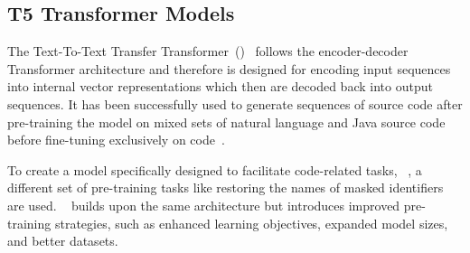 \subsection{T5 Transformer Models}

The Text-To-Text Transfer Transformer~(\tfive)~\cite{Raffel2019}
follows the encoder-decoder Transformer architecture and therefore is
designed for encoding input sequences into internal vector
representations which then are decoded back into output sequences.
It has been successfully used to generate sequences of source code
after pre-training the model on mixed sets of natural language and
Java source code before fine-tuning exclusively on
code~\cite{Mastropaolo2021}.

To create a model specifically designed to facilitate code-related
tasks, \codetfive~\cite{Wang2021}, a different set of pre-training
tasks like restoring the names of masked identifiers are used.
\codetfivelarge~\cite{Le2022} builds upon the same architecture but
introduces improved pre-training strategies, such as enhanced learning
objectives, expanded model sizes, and better datasets.


